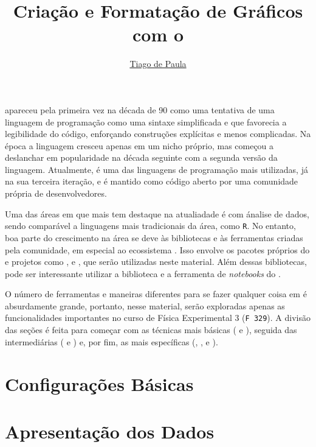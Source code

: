 \documentclass{article}
\title{Criação e Formatação de Gráficos com o}\softwarelogo
\author{\hyperref{mailto:t187679@dac.unicamp.br}{}{}{Tiago de Paula}}
\date{}
\begin{document}
    \maketitle

    \software apareceu pela primeira vez na década de 90 como uma tentativa de uma linguagem de programação como uma sintaxe simplificada e que favorecia a legibilidade do código, enforçando construções explícitas e menos complicadas. Na época a linguagem cresceu apenas em um nicho próprio, mas começou a deslanchar em popularidade na década seguinte com a segunda versão da linguagem. Atualmente, \software é uma das linguagens de programação mais utilizadas, já na sua terceira iteração, e é mantido como código aberto por uma comunidade própria de desenvolvedores.

    Uma das áreas em que \software mais tem destaque na atualiadade é com ánalise de dados, sendo comparável a linguagens mais tradicionais da área, como \texttt{R}. No entanto, boa parte do crescimento na área se deve às bibliotecas e às ferramentas criadas pela comunidade, em especial ao ecossistema . Isso envolve os pacotes próprios do  e projetos como ,  e , que serão utilizadas neste material. Além dessas bibliotecas, pode ser interessante utilizar a biblioteca  e a ferramenta de \textit{notebooks} do .

    O número de ferramentas e maneiras diferentes para se fazer qualquer coisa em \software é absurdamente grande, portanto, nesse material, serão exploradas apenas as funcionalidades importantes no curso de Física Experimental 3 (\texttt{F 329}). A divisão das seções é feita para começar com as técnicas mais básicas ( e ), seguida das intermediárias ( e ) e, por fim, as mais específicas (, ,  e ).

    \section{Configurações Básicas} \label{sec:basico}
        

    \section{Apresentação dos Dados} \label{sec:reta}
        
\end{document}
